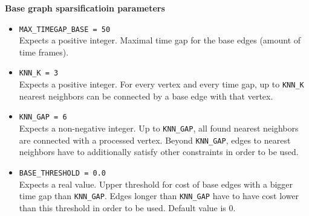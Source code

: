 \documentclass[a4paper,10pt]{article}
\begin{document}
\textbf{Base graph sparsificatioin parameters}
 \begin{itemize}
 \item  \texttt{MAX\_TIMEGAP\_BASE = 50} \\
 Expects a positive integer. Maximal time gap for the base edges (amount of time frames).
 
 
 \item  \texttt{KNN\_K = 3} \\
 Expects a positive integer.  For every vertex and every time gap, up to \texttt{KNN\_K} nearest neighbors can be connected by a base edge with that vertex.  
 
 \item  \texttt{KNN\_GAP = 6}\\
   Expects a non-negative integer. Up to \texttt{KNN\_GAP}, all found nearest neighbors are connected with a processed vertex. Beyond \texttt{KNN\_GAP}, edges to nearest neighbors have to additionally satisfy other constraints in order to be used.
  
 
 \item  \texttt{BASE\_THRESHOLD = 0.0} \\
 Expects a real value. Upper threshold for cost of base edges with a bigger time gap than \texttt{KNN\_GAP}. Edges longer than \texttt{KNN\_GAP} have to have cost lower than this threshold in order to be used. Default value is 0.
 

 
 

 \end{itemize}
 
\end{document}
